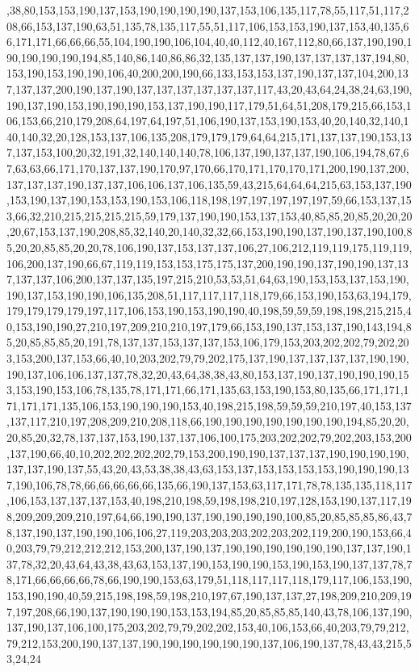 ,38,80,153,153,190,137,153,190,190,190,190,137,153,106,135,117,78,55,117,51,117,208,66,153,137,190,63,51,135,78,135,117,55,51,117,106,153,153,190,137,153,40,135,66,171,171,66,66,66,55,104,190,190,106,104,40,40,112,40,167,112,80,66,137,190,190,190,190,190,190,194,85,140,86,140,86,86,32,135,137,137,190,137,137,137,137,194,80,153,190,153,190,190,106,40,200,200,190,66,133,153,153,137,190,137,137,104,200,137,137,137,200,190,137,190,137,137,137,137,137,137,117,43,20,43,64,24,38,24,63,190,190,137,190,153,190,190,190,153,137,190,190,117,179,51,64,51,208,179,215,66,153,106,153,66,210,179,208,64,197,64,197,51,106,190,137,153,190,153,40,20,140,32,140,140,140,32,20,128,153,137,106,135,208,179,179,179,64,64,215,171,137,137,190,153,137,137,153,100,20,32,191,32,140,140,140,78,106,137,190,137,137,190,106,194,78,67,67,63,63,66,171,170,137,137,190,170,97,170,66,170,171,170,170,171,200,190,137,200,137,137,137,190,137,137,106,106,137,106,135,59,43,215,64,64,64,215,63,153,137,190,153,190,137,190,153,153,190,153,106,118,198,197,197,197,197,197,59,66,153,137,153,66,32,210,215,215,215,215,59,179,137,190,190,153,137,153,40,85,85,20,85,20,20,20,20,67,153,137,190,208,85,32,140,20,140,32,32,66,153,190,190,137,190,137,190,100,85,20,20,85,85,20,20,78,106,190,137,153,137,137,106,27,106,212,119,119,175,119,119,106,200,137,190,66,67,119,119,153,153,175,175,137,200,190,190,137,190,190,137,137,137,137,106,200,137,137,135,197,215,210,53,53,51,64,63,190,153,153,137,153,190,190,137,153,190,190,106,135,208,51,117,117,117,118,179,66,153,190,153,63,194,179,179,179,179,179,197,117,106,153,190,153,190,190,40,198,59,59,59,198,198,215,215,40,153,190,190,27,210,197,209,210,210,197,179,66,153,190,137,153,137,190,143,194,85,20,85,85,85,20,191,78,137,137,153,137,137,153,106,179,153,203,202,202,79,202,203,153,200,137,153,66,40,10,203,202,79,79,202,175,137,190,137,137,137,137,190,190,190,137,106,106,137,137,78,32,20,43,64,38,38,43,80,153,137,190,137,190,190,190,153,153,190,153,106,78,135,78,171,171,66,171,135,63,153,190,153,80,135,66,171,171,171,171,171,135,106,153,190,190,190,153,40,198,215,198,59,59,59,210,197,40,153,137,137,117,210,197,208,209,210,208,118,66,190,190,190,190,190,190,190,194,85,20,20,20,85,20,32,78,137,137,153,190,137,137,106,100,175,203,202,202,79,202,203,153,200,137,190,66,40,10,202,202,202,202,79,153,200,190,190,137,137,137,190,190,190,190,137,137,190,137,55,43,20,43,53,38,38,43,63,153,137,153,153,153,153,190,190,190,137,190,106,78,78,66,66,66,66,66,135,66,190,137,153,63,117,171,78,78,135,135,118,117,106,153,137,137,137,153,40,198,210,198,59,198,198,210,197,128,153,190,137,117,198,209,209,209,210,197,64,66,190,190,137,190,190,190,190,100,85,20,85,85,85,86,43,78,137,190,137,190,190,106,106,27,119,203,203,203,202,203,202,119,200,190,153,66,40,203,79,79,212,212,212,153,200,137,190,137,190,190,190,190,190,190,137,137,190,137,78,32,20,43,64,43,38,43,63,153,137,190,153,190,190,153,190,153,190,137,137,78,78,171,66,66,66,66,78,66,190,190,153,63,179,51,118,117,117,118,179,117,106,153,190,153,190,190,40,59,215,198,198,59,198,210,197,67,190,137,137,27,198,209,210,209,197,197,208,66,190,137,190,190,190,153,153,194,85,20,85,85,85,140,43,78,106,137,190,137,190,137,106,100,175,203,202,79,79,202,202,153,40,106,153,66,40,203,79,79,212,79,212,153,200,190,137,137,190,190,190,190,190,190,137,106,190,137,78,43,43,215,53,24,24